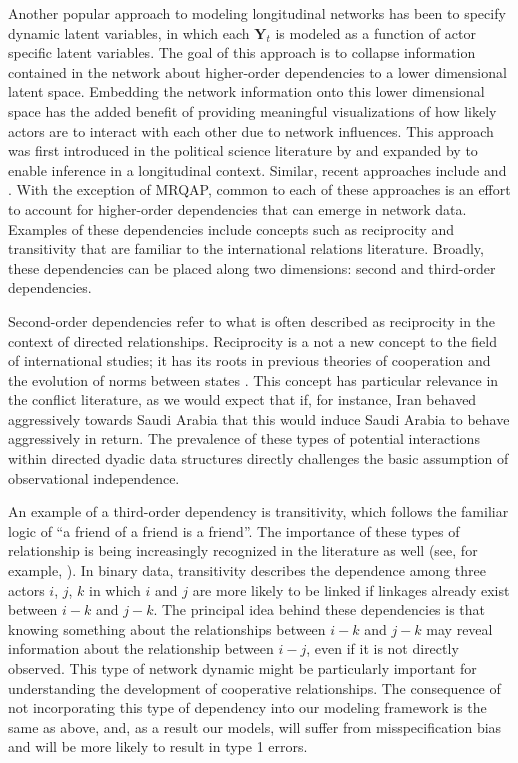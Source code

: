 \documentclass[3p,times,twocolumn,authoryear,12pt]{elsarticle}
\newcommand{\bl}[1]{{\mathbf #1}}
\begin{document}
Another popular approach to modeling longitudinal networks has been to specify dynamic latent variables, in which each $\bl Y_t$ is modeled as a function of actor specific latent variables. The goal of this approach is to collapse information contained in the network about higher-order dependencies to a lower dimensional latent space. Embedding the network information onto this lower dimensional space has the added benefit of providing meaningful visualizations of how likely actors are to interact with each other due to network influences. This approach was first introduced in the political science literature by \citet{ward:hoff:2007} and expanded by \citet{ward:ahlquist:etal:2012} to enable inference in a longitudinal context. Similar, recent approaches include \citet{durante:dunson:2014} and \citet{sewell:chen:2014}. With the exception of MRQAP, common to each of these approaches is an effort to account for higher-order dependencies that can emerge in network data. Examples of these dependencies include concepts such as reciprocity and transitivity that are familiar to the international relations literature. Broadly, these dependencies can be placed along two dimensions: second and third-order dependencies. 

Second-order dependencies refer to what is often described as reciprocity in the context of directed relationships. Reciprocity is a not a new concept to the field of international studies; it has its roots in previous theories of cooperation and the evolution of norms between states \citep{richardson:1960,choucri:north:1972,ward:1981,cusack:ward:1981,ward:1984,goldstein:1991}. This concept has particular relevance in the conflict literature, as we would expect that if, for instance, Iran behaved aggressively towards Saudi Arabia that this would induce Saudi Arabia to behave aggressively in return. The prevalence of these types of potential interactions within directed dyadic data structures directly challenges the basic assumption of observational independence.

An example of a third-order dependency is transitivity, which follows the familiar logic of ``a friend of a friend is a friend''. The importance of these types of relationship is being increasingly recognized in the literature as well (see, for example, \citealp{lai:1995,manger:etal:2012,kinne:2013}). In binary data, transitivity describes the dependence among three actors $i$, $j$, $k$ in which $i$ and $j$ are more likely to be linked if linkages already exist between $i - k$ and $j - k$. The principal idea behind these dependencies is that knowing something about the relationships between $i-k$ and $j-k$ may reveal information about the relationship between $i-j$, even if it is not directly observed. This type of network dynamic might be particularly important for understanding the development of cooperative relationships. The consequence of not incorporating this type of dependency into our modeling framework is the same as above, and, as a result our models, will suffer from misspecification bias and will be more likely to result in type 1 errors. 
\end{document}
